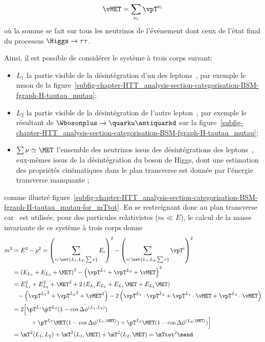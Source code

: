 \begin{equation}
\vMET = \sum_{\nu_i} \vpT^{\nu_i}
\end{equation}
où la somme se fait sur tous les neutrinos de l'événement dont ceux de l'état final du processus $\Higgs\to\tau\tau$.
\par
Ainsi, il est possible de considérer le système à trois corps suivant:
\begin{itemize}
\item $L_1$ la partie visible de la désintégration d'un des leptons~\tau, par exemple le muon de la figure~\ref{subfig-chapter-HTT_analysis-section-categorisation-BSM-fgraph-H-tautau_mutau};
\item $L_2$ la partie visible de la désintégration de l'autre lepton~\tau, par exemple le \tauh résultant de $\Wbosonplus\to\quarku\antiquarkd$ sur la figure~\ref{subfig-chapter-HTT_analysis-section-categorisation-BSM-fgraph-H-tautau_mutau};
\item $\sum\nu\simeq\MET$ l'ensemble des neutrinos issus des désintégrations des leptons~\tau, eux-mêmes issus de la désintégration du boson de Higgs, dont une estimation des propriétés cinématiques dans le plan transverse est donnée par l'énergie transverse manquante \vMET;
\end{itemize}
comme illustré figure~\ref{subfig-chapter-HTT_analysis-section-categorisation-BSM-fgraph-H-tautau_mutau-for_mTtot}.
En se restreignant donc au plan transverse car \MET\ est utilisée,
pour des particules relativistes ($m\ll E$),
le calcul de la \og masse invariante \fg{} de ce système à trois corps donne
\begin{align}
m^2 &= E^2 - p^2
= \left( \sum_{i \in \set{L_1,L_2,\sum\nu}} E_i \right)^2 - \left( \sum_{i \in \set{L_1,L_2,\sum\nu}} \vpT^i \right)^2
\nonumber\\
&= \left( E_{L_1} + E_{L_2} + \MET \right)^2 - \left( \vpT^{L_1} + \vpT^{L_2} + \vMET \right)^2
\nonumber\\
&= E_{L_1}^2 + E_{L_2}^2 + \MET^2 + 2 \left( E_{L_1}E_{L_2} + E_{L_1}\MET + E_{L_2}\MET \right)
\nonumber\\
&\hphantom{=} - \left( {\vpT^{L_1}}^2 + {\vpT^{L_2}}^2 + {\vMET}^2 \right) - 2 \left( \vpT^{L_1}\cdot\vpT^{L_2} + \vpT^{L_1}\cdot\vMET + \vpT^{L_2}\cdot\vMET \right)
\nonumber\\
&= 2 \Big[ \pT^{L_1}\pT^{L_2}(1-\cos\Delta\phi^{(L_1,L_2)})
\nonumber\\
&\hphantom{=2(} \quad + \pT^{L_1}\MET(1-\cos\Delta\phi^{(L_1,\MET)}) + \pT^{L_2}\MET(1-\cos\Delta\phi^{(L_2,\MET)}) \Big]
\nonumber\\
&= \mT^2 (L_1,L_2) + \mT^2 (L_1,\MET) + \mT^2 (L_2,\MET) = {\mTtot}^2
\mend
\end{align}
